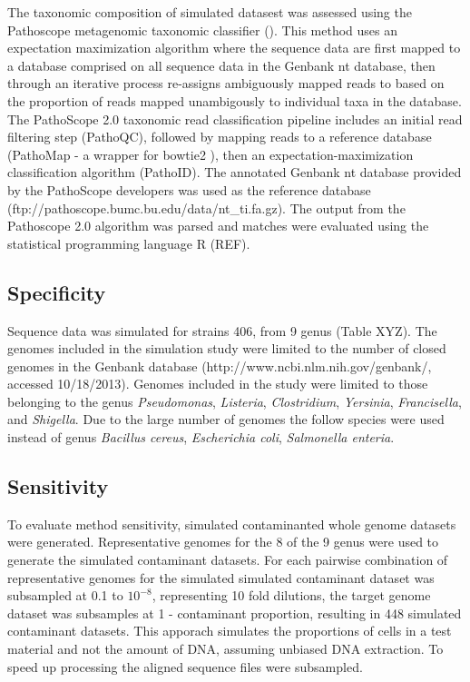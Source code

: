 \documentclass[fleqn,10pt,lineno]{wlpeerj}\usepackage[]{graphicx}\usepackage[]{color}
\begin{document}
The taxonomic composition of simulated datasest was assessed using the Pathoscope metagenomic taxonomic classifier  (\citep{Francis2013}). This method uses an expectation maximization algorithm where the sequence data are first mapped to a database comprised on all sequence data in the Genbank nt database, then through an iterative process re-assigns ambiguously mapped reads to based on the proportion of reads mapped unambigously to individual taxa in the database. The PathoScope 2.0 taxonomic read classification pipeline includes an initial read filtering step (PathoQC), followed by mapping reads to a reference database (PathoMap - a wrapper for bowtie2 \citep{Langmead2012}), then an expectation-maximization classification algorithm (PathoID). The annotated Genbank nt database provided by the PathoScope developers was used as the reference database (ftp://pathoscope.bumc.bu.edu/data/nt\_ti.fa.gz). The output from the Pathoscope 2.0 algorithm was parsed and matches were evaluated using the statistical programming language R (REF).

\subsection*{Specificity} 
Sequence data was simulated for strains 406, from 9 genus (Table XYZ). 
The genomes included in the simulation study were limited to the number of closed genomes in the Genbank database (http://www.ncbi.nlm.nih.gov/genbank/, accessed 10/18/2013). 
Genomes included in the study were limited to those belonging to the genus \textit{Pseudomonas},
\textit{Listeria}, \textit{Clostridium}, \textit{Yersinia}, \textit{Francisella}, and \textit{Shigella}. 
Due to the large number of genomes the follow species were used instead of genus \textit{Bacillus cereus}, \textit{Escherichia coli}, \textit{Salmonella enteria}. 

\subsection*{Sensitivity}
To evaluate method sensitivity, simulated contaminanted whole genome datasets were generated. 
Representative genomes for the 8 of the 9 genus were used to generate the simulated contaminant datasets. 
For each pairwise combination of representative genomes for the simulated simulated contaminant dataset was subsampled at 0.1 to $10^{-8}$, representing 10 fold dilutions, the target genome dataset was subsamples at 1 - contaminant proportion, resulting in 448 simulated contaminant datasets. 
This apporach simulates the proportions of cells in a test material and not the amount of DNA, assuming unbiased DNA extraction. 
To speed up processing the aligned sequence files were subsampled. 
\end{document}
